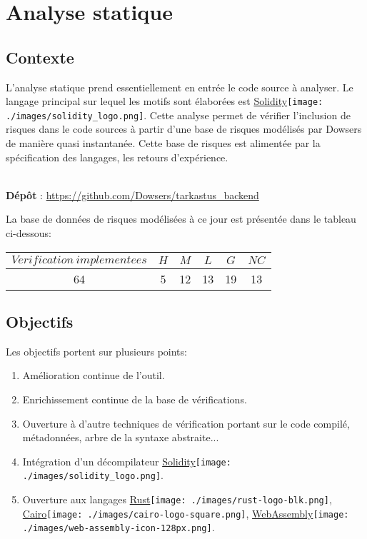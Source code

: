 \documentclass[10pt,a4paper]{article}
\begin{document}
\section{Analyse statique}
\subsection{Contexte}
L'analyse statique prend essentiellement en entrée le code source à analyser.
Le langage principal sur lequel les motifs sont élaborées est \href{https://soliditylang.org/}{Solidity}\texttt{[image: ./images/solidity\_logo.png]}.
Cette analyse permet de vérifier l'inclusion de risques dans le code sources à partir d'une base de risques modélisés par Dowsers de manière quasi instantanée.
Cette base de risques est alimentée par la spécification des langages, les retours d'expérience.
\\
\\
\begin{center}
\textbf{Dépôt} : \url{https://github.com/Dowsers/tarkastus_backend}\\
\end{center}

La base de données de risques modélisées à ce jour est présentée dans le tableau ci-dessous:
\begin{center}
\begin{tabular}{|c|c|c|c|c|c|}
\hline 
$Verification\ implementees$ & $H$ & $M$ & $L$ & $G$ & $NC$\\ 
\hline 
64 & 5 & 12 & 13 & 19 & 13\\ 
\hline 
\end{tabular}
\end{center}

\subsection{Objectifs}
Les objectifs portent sur plusieurs points:
\begin{enumerate}
\item Amélioration continue de l'outil.
\item Enrichissement continue de la base de vérifications.
\item Ouverture à d'autre techniques de vérification portant sur le code compilé, métadonnées, arbre de la syntaxe abstraite...
\item Intégration d'un décompilateur \href{https://soliditylang.org/}{Solidity}\texttt{[image: ./images/solidity\_logo.png]}.
\item Ouverture aux langages \href{https://www.rust-lang.org/fr/}{Rust}\texttt{[image: ./images/rust-logo-blk.png]}, \href{https://www.cairo-lang.org/}{Cairo}\texttt{[image: ./images/cairo-logo-square.png]}, \href{https://webassembly.org/}{WebAssembly}\texttt{[image: ./images/web-assembly-icon-128px.png]}.
\end{enumerate}
\end{document}
